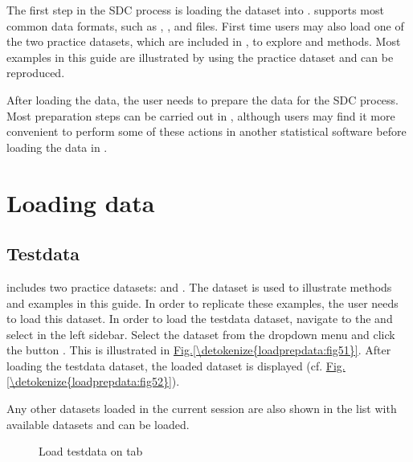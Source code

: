 \documentclass[letterpaper,10pt,english]{sphinxmanual}
\begin{document}
The first step in the SDC process is loading the dataset into .  supports
most common data formats, such as , ,  and  files. First time users
may also load one of the two practice datasets, which are included in ,
to explore  and methods. Most examples in this guide are illustrated by
using the practice dataset  and can be reproduced.

After loading the data, the user needs to prepare the data for the SDC process.
Most preparation steps can be carried out in , although users may find it
more convenient to perform some of these actions in another statistical software
before loading the data in .


\section{Loading data}
\label{\detokenize{loadprepdata:loading-data}}

\subsection{Testdata}
\label{\detokenize{loadprepdata:testdata}}
 includes two practice datasets:  and . The dataset
 is used to illustrate methods and examples in this guide. In order to
replicate these examples, the user needs to load this dataset. In order to load the testdata
dataset, navigate to the  and select  in the left sidebar.
Select the dataset from the dropdown menu and click the button .
This is illustrated in \hyperref[\detokenize{loadprepdata:fig51}]{Fig.\@ \ref{\detokenize{loadprepdata:fig51}}}. After loading the testdata dataset, the loaded
dataset is displayed (cf. \hyperref[\detokenize{loadprepdata:fig52}]{Fig.\@ \ref{\detokenize{loadprepdata:fig52}}}).

Any other datasets loaded in the current  session are also shown in the list with
available datasets and can be loaded.

\begin{figure}[htbp]
\centering
\capstart

\noindent{}
\caption{Load testdata on  tab}\label{\detokenize{loadprepdata:fig51}}\label{\detokenize{loadprepdata:id1}}\end{figure}
\end{document}
